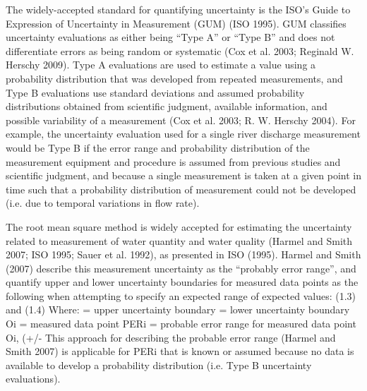 \begin{linenumbers}
	
The widely-accepted standard for quantifying uncertainty is the ISO’s Guide to Expression of Uncertainty in Measurement (GUM) (ISO 1995).  GUM classifies uncertainty evaluations as either being “Type A” or “Type B” and does not differentiate errors as being random or systematic (Cox et al. 2003; Reginald W. Herschy 2009).  Type A evaluations are used to estimate a value using a probability distribution that was developed from repeated measurements, and Type B evaluations use standard deviations and assumed probability distributions obtained from scientific judgment, available information, and possible variability of a measurement (Cox et al. 2003; R. W. Herschy 2004).  For example, the uncertainty evaluation used for a single river discharge measurement would be Type B if the error range and probability distribution of the measurement equipment and procedure is assumed from previous studies and scientific judgment, and because a single measurement is taken at a given point in time such that a probability distribution of measurement could not be developed (i.e. due to temporal variations in flow rate).

The root mean square method is widely accepted for estimating the uncertainty related to measurement of water quantity and water quality (Harmel and Smith 2007; ISO 1995; Sauer et al. 1992), as presented in ISO (1995).  Harmel and Smith (2007) describe this measurement uncertainty as the “probably error range”, and quantify upper and lower uncertainty boundaries for measured data points as the following when attempting to specify an expected range of expected values:
(1.3)
and
(1.4)
Where:	 = upper uncertainty boundary
= lower uncertainty boundary
Oi = measured data point
PERi = probable error range for measured data point Oi, (+/- %
This approach for describing the probable error range (Harmel and Smith 2007) is applicable for PERi that is known or assumed because no data is available to develop a probability distribution (i.e. Type B uncertainty evaluations).






\end{linenumbers}
